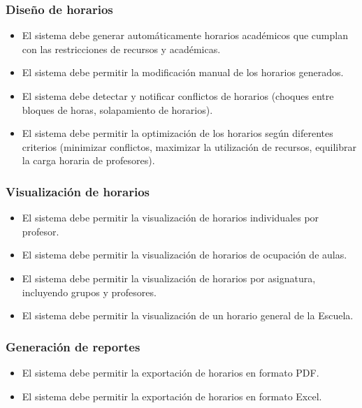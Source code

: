 \documentclass[12pt]{article} %
\begin{document}
    \subsubsection{Diseño de horarios}
    \begin{itemize}
        \item El sistema debe generar automáticamente horarios académicos que cumplan con las restricciones de recursos y académicas.
        \item El sistema debe permitir la modificación manual de los horarios generados.
        \item El sistema debe detectar y notificar conflictos de horarios (choques entre bloques de horas, solapamiento de horarios).
        \item El sistema debe permitir la optimización de los horarios según diferentes criterios (minimizar conflictos, maximizar la utilización de recursos, equilibrar la carga horaria de profesores).
    \end{itemize}
    
    \subsubsection{Visualización de horarios}
    \begin{itemize}
        \item El sistema debe permitir la visualización de horarios individuales por profesor.
        \item El sistema debe permitir la visualización de horarios de ocupación de aulas.
        \item El sistema debe permitir la visualización de horarios por asignatura, incluyendo grupos y profesores.
        \item El sistema debe permitir la visualización de un horario general de la Escuela.
    \end{itemize}
    
    \subsubsection{Generación de reportes}
    \begin{itemize}
        \item El sistema debe permitir la exportación de horarios en formato PDF.
        \item El sistema debe permitir la exportación de horarios en formato Excel.
    \end{itemize}
\end{document}
